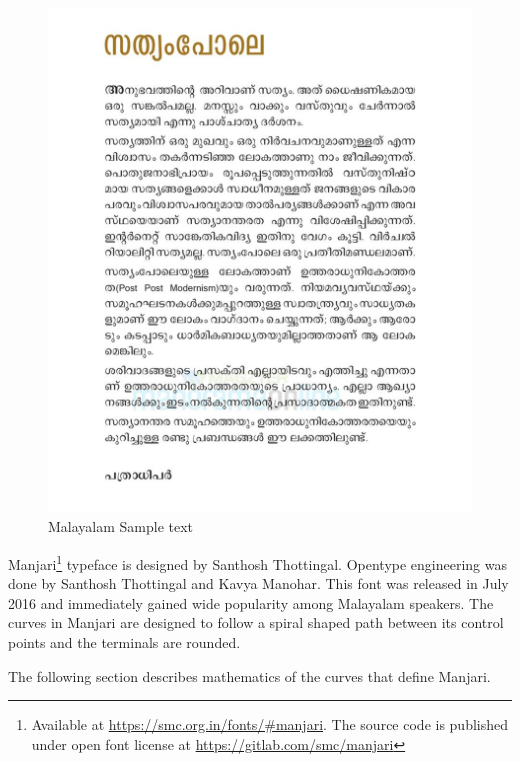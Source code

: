 \documentclass[11pt,twoside,a4paper,parskip=full]{scrartcl}
\begin{document}
\begin{figure}
	\includegraphics[width=\textwidth]{images/malayalam-sample.png}
	\caption{Malayalam Sample text}
	\label{malsample}
\end{figure}

 
Manjari\footnote{Available at \url{https://smc.org.in/fonts/\#manjari}. The source code is published under open font license at \url{https://gitlab.com/smc/manjari}} typeface is designed by Santhosh Thottingal. Opentype engineering was done by Santhosh Thottingal and Kavya Manohar. This font was released in July 2016 and immediately gained wide popularity among Malayalam speakers. The curves in Manjari are designed to follow a spiral shaped path between its control points and the terminals are rounded. %

 
 The following section describes mathematics of the curves that define Manjari. 
 
\end{document}
